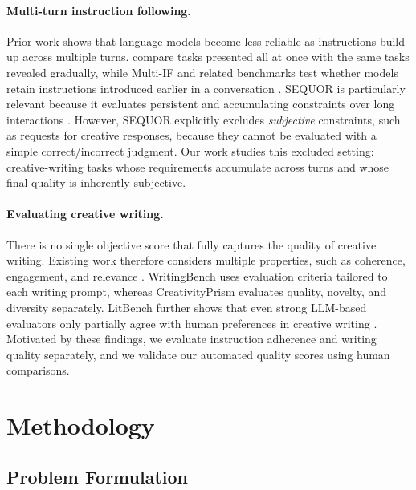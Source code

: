 \documentclass{article}
\begin{document}
\paragraph{Multi-turn instruction following.}
Prior work shows that language models become less reliable as instructions build up across multiple turns. \citet{laban2025llmslostmultiturnconversation} compare tasks presented all at once with the same tasks revealed gradually, while Multi-IF and related benchmarks test whether models retain instructions introduced earlier in a conversation \citep{he2024multiifbenchmarkingllmsmultiturn,jia2026battleanotherprobingllms}. SEQUOR is particularly relevant because it evaluates persistent and accumulating constraints over long interactions \citep{canaverde2026sequormultiturnbenchmarkrealistic}. However, SEQUOR explicitly excludes \emph{subjective} constraints, such as requests for creative responses, because they cannot be evaluated with a simple correct/incorrect judgment. Our work studies this excluded setting: creative-writing tasks whose requirements accumulate across turns and whose final quality is inherently subjective.
\paragraph{Evaluating creative writing.}
There is no single objective score that fully captures the quality of creative writing. Existing work therefore considers multiple properties, such as coherence, engagement, and relevance \citep{chhun2022humancriteriaautomaticmetrics,chhun-etal-2024-language}. WritingBench uses evaluation criteria tailored to each writing prompt, whereas CreativityPrism evaluates quality, novelty, and diversity separately\citep{wu2025writingbenchcomprehensivebenchmarkgenerative,hou2026creativityprismcrossdomainevaluationframework}. LitBench further shows that even strong LLM-based evaluators only partially agree with human preferences in creative writing \citep{fein2025litbenchbenchmarkdatasetreliable}. Motivated by these findings, we evaluate instruction adherence and writing quality separately, and we validate our automated quality scores using human comparisons.
\section{Methodology}

\subsection{Problem Formulation}
\end{document}
